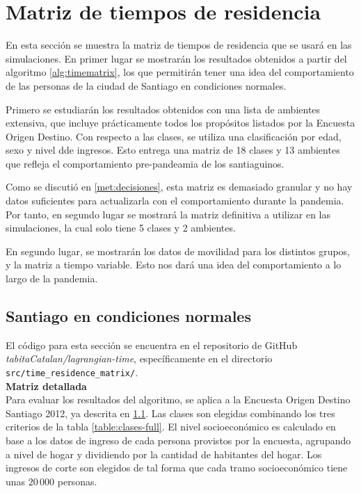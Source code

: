 \section{Matriz de tiempos de residencia} \label{res:matriz}

En esta sección se muestra la matriz de tiempos de residencia que se usará en las simulaciones. En primer lugar se mostrarán los resultados obtenidos a partir del algoritmo \ref{alg:timematrix}, los que permitirán tener una idea del comportamiento de las personas de la ciudad de Santiago en condiciones normales.

Primero se estudiarán los resultados obtenidos con una lista de ambientes extensiva, que incluye prácticamente todos los propósitos listados por la Encuesta Origen Destino. Con respecto a las clases, se utiliza una clasificación por edad, sexo y nivel dde ingresos. Esto entrega una matriz de 18 clases y 13 ambientes que refleja el comportamiento pre-pandeamia de los santiaguinos.

Como se discutió en \ref{met:decisiones}, esta matriz es demasiado granular y no hay datos suficientes para actualizarla con el comportamiento durante la pandemia. Por tanto, en segundo lugar se mostrará la matriz definitiva a utilizar en las simulaciones, la cual solo tiene 5 clases y 2 ambientes.

En segundo lugar, se mostrarán los datos de movilidad para los distintos grupos, y la matriz a tiempo variable. Esto nos dará una idea del comportamiento a lo largo de la pandemia. 

\subsection{Santiago en condiciones normales}

El código para esta sección se encuentra en el repositorio de GitHub \textit{tabitaCatalan/lagrangian-time}, específicamente en el directorio \texttt{src/time\_residence\_matrix/}.\\


\noindent \textbf{Matriz detallada}\\
Para evaluar los resultados del algoritmo, se aplica a la Encuesta Origen Destino Santiago 2012, ya descrita en \ref{}. Las clases son elegidas combinando los tres criterios de la tabla \ref{table:clases-full}. El nivel socioeconómico es calculado en base a los datos de ingreso de cada persona provistos por la encuesta, agrupando a nivel de hogar y dividiendo por la cantidad de habitantes del hogar. Los ingresos de corte son elegidos de tal forma que cada tramo socioeconómico tiene unas \(20\,000\) personas.

